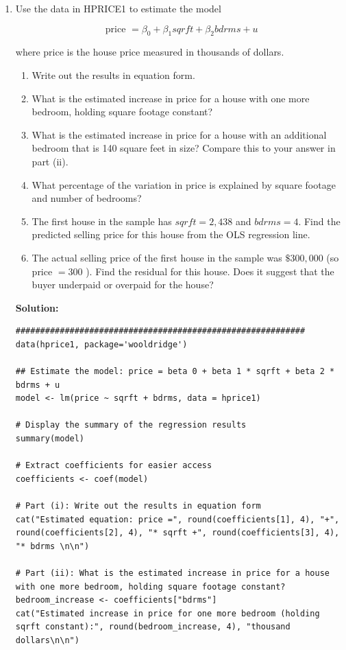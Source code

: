 \documentclass[12pt]{article}
\begin{document}
\begin{enumerate}
{}


\item Use the data in HPRICE1 to estimate the model

$$
\text { price }=\beta_0+\beta_1 s q r f t+\beta_2 b d r m s+u
$$

where price is the house price measured in thousands of dollars.
\begin{enumerate}
    \item Write out the results in equation form.
\item What is the estimated increase in price for a house with one more bedroom, holding square footage constant?
\item What is the estimated increase in price for a house with an additional bedroom that is 140 square feet in size? Compare this to your answer in part (ii).
\item What percentage of the variation in price is explained by square footage and number of bedrooms?
\item The first house in the sample has $s q r f t=2,438$ and $b d r m s=4$. Find the predicted selling price for this house from the OLS regression line.
\item The actual selling price of the first house in the sample was $\$ 300,000$ (so price $=300$ ). Find the residual for this house. Does it suggest that the buyer underpaid or overpaid for the house?
\end{enumerate}


{\color{blue}
\noindent \textbf{Solution:}

\begin{lstlisting}
###########################################################
data(hprice1, package='wooldridge')

## Estimate the model: price = beta 0 + beta 1 * sqrft + beta 2 * bdrms + u
model <- lm(price ~ sqrft + bdrms, data = hprice1)

# Display the summary of the regression results
summary(model)

# Extract coefficients for easier access
coefficients <- coef(model)

# Part (i): Write out the results in equation form
cat("Estimated equation: price =", round(coefficients[1], 4), "+", round(coefficients[2], 4), "* sqrft +", round(coefficients[3], 4), "* bdrms \n\n")

# Part (ii): What is the estimated increase in price for a house with one more bedroom, holding square footage constant?
bedroom_increase <- coefficients["bdrms"]
cat("Estimated increase in price for one more bedroom (holding sqrft constant):", round(bedroom_increase, 4), "thousand dollars\n\n")


\end{lstlisting}}
\end{enumerate}
\end{document}
